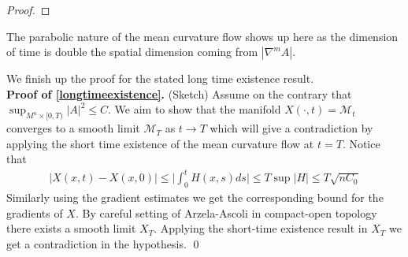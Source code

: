 \begin{proof}
\begin{comment}
where
$$
A_{l} \doteqdot \frac{1}{4} \sum_{\substack{i+j+k=l \\ i, j, k<l}} \frac{C_i C_j C_k}{a_i a_j a_k}
$$
If we choose
\[ a_{l} \doteqdot \frac{2 a_{\ell-1}}{\left(C_0+A_{l}^{\frac{1}{3}}\right) c+l} \]
then 
\[ \partial_t \leq \Delta Q_m  c r^{-4}\left(C_0^2+\sum_{l=1}^m A_{l}\right) \doteqdot C_m r^{-4} \]

and the maximum principle yields 
\[ Q_m \leq C_m r^{-2} \]
in $M^n \times\left[0, r^2\right]$.
\end{comment}
\end{proof}

\begin{remark}
    The parabolic nature of the mean curvature flow shows up here as the dimension of time is double the spatial dimension coming from $ |\nabla^{m}A| $.
\end{remark}
We finish up the proof for the stated long time existence result. \\

\textbf{Proof of \cref{longtimeexistence}.} (Sketch) 
    Assume on the contrary that $ \sup_{M^{n} \times [0, T)}|A|^{2} \le C $. We aim to show that the manifold $X(\cdot, t)= \mathcal{M}_{t} $ converges to a smooth limit $ \mathcal{M}_{T} $ as $ t \to T $ which will give a contradiction by applying the short time existence of the mean curvature flow at $ t  = T $. Notice that \begin{align*}
        |X(x,t)-X(x,0)| \le  \bigg|\int_{0}^{t} H(x,s) ds \bigg| \le T \sup |H| \le T \sqrt{nC_{0}}
    \end{align*}
    Similarly using the gradient estimates we get the corresponding bound for the gradients of $ X $. By careful setting of Arzela-Ascoli in compact-open topology there exists a smooth limit $ X_{T} $. Applying the short-time existence result in $ X_{T} $ we get a contradiction in the hypothesis. \qed

